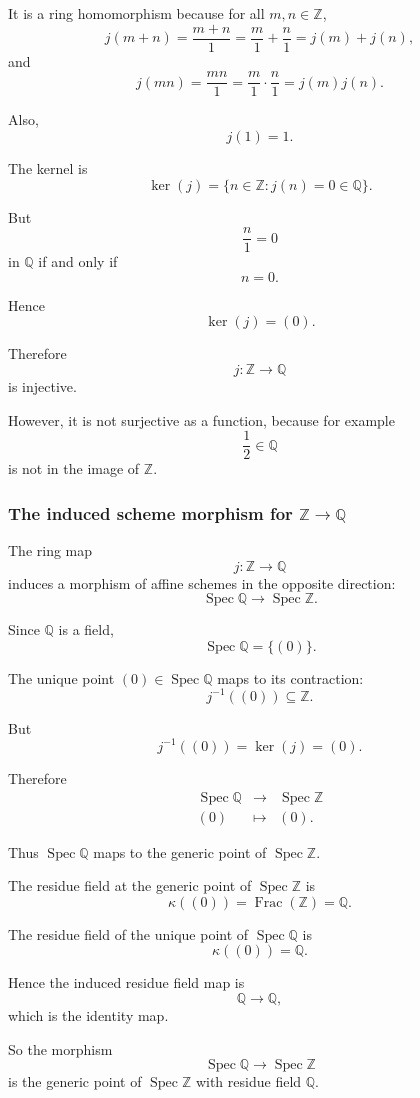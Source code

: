 \documentclass[12pt,a4paper]{article}
\DeclareMathOperator{\Spec}{Spec}
\theoremstyle{notespace}
\begin{document}
It is a ring homomorphism because for all \(m,n\in\mathbb Z\),
\[
j(m+n)=\frac{m+n}{1}
=
\frac{m}{1}+\frac{n}{1}
=
j(m)+j(n),
\]
and
\[
j(mn)=\frac{mn}{1}
=
\frac{m}{1}\cdot \frac{n}{1}
=
j(m)j(n).
\]

Also,
\[
j(1)=1.
\]

The kernel is
\[
\ker(j)=\{n\in\mathbb Z:j(n)=0\in\mathbb Q\}.
\]

But
\[
\frac{n}{1}=0
\]
in \(\mathbb Q\) if and only if
\[
n=0.
\]

Hence
\[
\ker(j)=(0).
\]

Therefore
\[
j:\mathbb Z\to\mathbb Q
\]
is injective.

However, it is not surjective as a function, because for example
\[
\frac12\in\mathbb Q
\]
is not in the image of \(\mathbb Z\).

\subsubsection*{The induced scheme morphism for \texorpdfstring{\(\mathbb Z\to\mathbb Q\)}{Z to Q}}

The ring map
\[
j:\mathbb Z\to\mathbb Q
\]
induces a morphism of affine schemes in the opposite direction:
\[
\Spec\mathbb Q\longrightarrow \Spec\mathbb Z.
\]

Since \(\mathbb Q\) is a field,
\[
\Spec\mathbb Q=\{(0)\}.
\]

The unique point \((0)\in\Spec\mathbb Q\) maps to its contraction:
\[
j^{-1}((0))\subseteq \mathbb Z.
\]

But
\[
j^{-1}((0))=\ker(j)=(0).
\]

Therefore
\[
\begin{array}{ccc}
	\Spec\mathbb Q & \longrightarrow & \Spec\mathbb Z
	\\[4pt]
	(0) & \longmapsto & (0).
\end{array}
\]

Thus \(\Spec\mathbb Q\) maps to the generic point of \(\Spec\mathbb Z\).

The residue field at the generic point of \(\Spec\mathbb Z\) is
\[
\kappa((0))=\operatorname{Frac}(\mathbb Z)=\mathbb Q.
\]

The residue field of the unique point of \(\Spec\mathbb Q\) is
\[
\kappa((0))=\mathbb Q.
\]

Hence the induced residue field map is
\[
\mathbb Q\longrightarrow \mathbb Q,
\]
which is the identity map.

So the morphism
\[
\Spec\mathbb Q\to \Spec\mathbb Z
\]
is the generic point of \(\Spec\mathbb Z\) with residue field \(\mathbb Q\).
\end{document}
